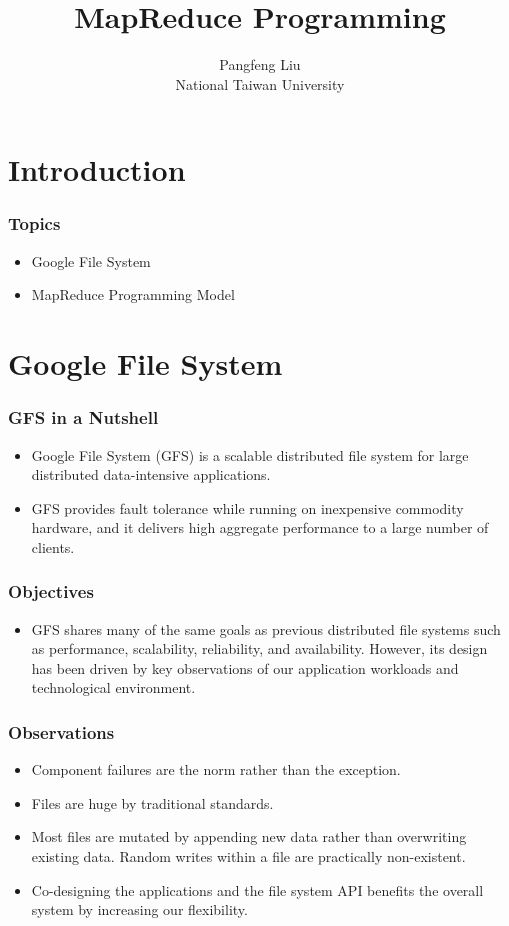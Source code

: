 \documentclass{beamer}
\begin{document}
\title{MapReduce Programming}

\author{Pangfeng Liu \\ National Taiwan University}

\begin{frame}
  \titlepage
\end{frame}

\section{Introduction}

\begin{frame}
  \frametitle{Topics}
  \begin{itemize}
    \item Google File System
    \item MapReduce Programming Model
  \end{itemize}
\end{frame}

\section{Google File System}
\begin{frame}
  \frametitle{GFS in a Nutshell}
  \begin{itemize}
    \item Google File System (GFS) is a scalable distributed file
      system for large distributed data-intensive applications.
    \item GFS provides fault tolerance while running on inexpensive
      commodity hardware, and it delivers high aggregate performance
      to a large number of clients.
  \end{itemize}
\end{frame}

\begin{frame}
  \frametitle{Objectives} 
  \begin{itemize}
  \item GFS shares many of the same goals as previous distributed file
    systems such as performance, scalability, reliability, and
    availability. However, its design has been driven by key
    observations of our application workloads and technological
    environment.
  \end{itemize}
\end{frame}

\begin{frame}
  \frametitle{Observations}
  \begin{itemize}
    \item Component failures are the norm rather than the exception.
    \item Files are huge by traditional standards.
    \item Most files are mutated by appending new data rather than
      overwriting existing data. Random writes within a file are
      practically non-existent.
    \item Co-designing the applications and the file system API
      benefits the overall system by increasing our flexibility.
  \end{itemize}
\end{frame}
\end{document}
